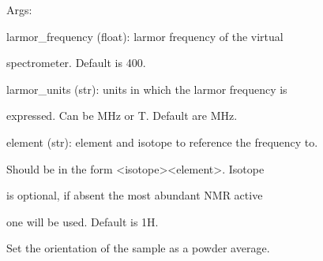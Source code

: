 \documentclass[letterpaper,10pt,english]{sphinxmanual}
\begin{document}
\begin{fulllineitems}
\begin{fulllineitems}
\begin{DUlineblock}{0em}
\item[] Args:
\item[]
\begin{DUlineblock}{\DUlineblockindent}
\item[] larmor\_frequency (float): larmor frequency of the virtual
\item[]
\begin{DUlineblock}{\DUlineblockindent}
\item[] spectrometer. Default is 400.
\end{DUlineblock}
\item[] larmor\_units (str): units in which the larmor frequency is
\item[]
\begin{DUlineblock}{\DUlineblockindent}
\item[] expressed. Can be MHz or T. Default are MHz.
\end{DUlineblock}
\item[] element (str): element and isotope to reference the frequency to.
\item[]
\begin{DUlineblock}{\DUlineblockindent}
\item[] Should be in the form \textless{}isotope\textgreater{}\textless{}element\textgreater{}. Isotope
\item[] is optional, if absent the most abundant NMR active
\item[] one will be used. Default is 1H.
\end{DUlineblock}
\end{DUlineblock}
\end{DUlineblock}

\end{fulllineitems}


\begin{fulllineitems}
\label{doctree/soprano.calculate.nmr.nmr:soprano.calculate.nmr.nmr.NMRCalculator.set_powder}
Set the orientation of the sample as a powder average.


\end{fulllineitems}
\end{fulllineitems}
\end{document}

